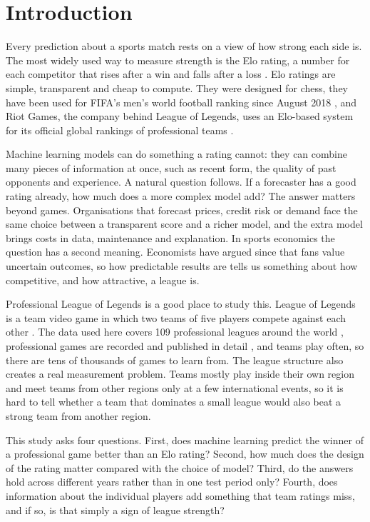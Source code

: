 \documentclass[12pt,a4paper]{article}
\begin{document}
\section{Introduction}

Every prediction about a sports match rests on a view of how strong each side is. The most widely used way to measure strength is the Elo rating, a number for each competitor that rises after a win and falls after a loss \citep{elo1978}. Elo ratings are simple, transparent and cheap to compute. They were designed for chess, they have been used for FIFA's men's world football ranking since August 2018 \citep{fifa2018}, and Riot Games, the company behind League of Legends, uses an Elo-based system for its official global rankings of professional teams \citep{riot2024}.

Machine learning models can do something a rating cannot: they can combine many pieces of information at once, such as recent form, the quality of past opponents and experience. A natural question follows. If a forecaster has a good rating already, how much does a more complex model add? The answer matters beyond games. Organisations that forecast prices, credit risk or demand face the same choice between a transparent score and a richer model, and the extra model brings costs in data, maintenance and explanation. In sports economics the question has a second meaning. Economists have argued since \citet{rottenberg1956} that fans value uncertain outcomes, so how predictable results are tells us something about how competitive, and how attractive, a league is.

Professional League of Legends is a good place to study this. League of Legends is a team video game in which two teams of five players compete against each other \citep{do2021}. The data used here covers 109 professional leagues around the world \citep{ei2026}, professional games are recorded and published in detail \citep{oracleselixir}, and teams play often, so there are tens of thousands of games to learn from. The league structure also creates a real measurement problem. Teams mostly play inside their own region and meet teams from other regions only at a few international events, so it is hard to tell whether a team that dominates a small league would also beat a strong team from another region.

This study asks four questions. First, does machine learning predict the winner of a professional game better than an Elo rating? Second, how much does the design of the rating matter compared with the choice of model? Third, do the answers hold across different years rather than in one test period only? Fourth, does information about the individual players add something that team ratings miss, and if so, is that simply a sign of league strength?
\end{document}
